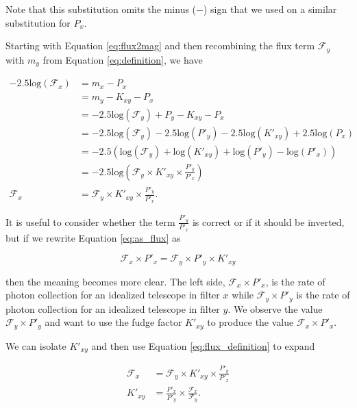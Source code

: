 \documentclass[linenumbers]{aastex631}
\begin{document}
Note that this substitution omits the minus ($-$) sign that we used on a
similar substitution for $P_x$.

Starting with Equation \ref{eq:flux2mag} and then
recombining the flux term $\mathcal{F}_y$ with $m_y$ from Equation
\ref{eq:definition}, we have

\begin{equation}
\begin{aligned}
\label{eq:as_flux}
  -2.5 \text{log}(\mathcal{F}_x)
      &= m_x - P_x \\
      &= m_y - K_{xy} - P_x \\
      &= -2.5 \text{log}(\mathcal{F}_y) + P_y - K_{xy} - P_x \\
      &= -2.5 \text{log}(\mathcal{F}_y)
         - 2.5 \text{log}(P'_y)
         - 2.5 \text{log}(K'_{xy})
         + 2.5 \text{log}(P_x) \\
      &= -2.5 \left(
         \text{log}(\mathcal{F}_y)
         + \text{log}(K'_{xy})
         + \text{log}(P'_y)
         - \text{log}(P'_x)
        \right) \\
      &= -2.5 \text{log}\left(
        \mathcal{F}_y
        \times K'_{xy}
        \times \frac{P'_y}{P'_x}\right) \\
  \mathcal{F}_x &= \mathcal{F}_y \times K'_{xy} \times \frac{P'_y}{P'_x}.
\end{aligned}
\end{equation}

It is useful to consider whether the term $\frac{P'_y}{P'_x}$ is correct or if
it should be inverted, but if we rewrite Equation \ref{eq:as_flux} as

\begin{equation}
  \mathcal{F}_x \times P'_x = \mathcal{F}_y \times P'_y \times K'_{xy}
\end{equation}

\noindent then the meaning becomes more clear. The left side, $\mathcal{F}_x
\times P'_x$, is the rate of photon collection for an idealized telescope in
filter $x$ while $\mathcal{F}_y \times P'_y$ is the rate of photon collection
for an idealized telescope in filter $y$. We observe the value $\mathcal{F}_y
\times P'_y$ and want to use the fudge factor $K'_{xy}$ to produce the value
$\mathcal{F}_x \times P'_x$.

We can isolate $K'_{xy}$ and then use Equation \ref{eq:flux_definition} to expand

\begin{equation}
\begin{aligned}
  \mathcal{F}_x &= \mathcal{F}_y \times K'_{xy} \times \frac{P'_y}{P'_x} \\
        K'_{xy} &= \frac{P'_x}{P'_y} \times \frac{\mathcal{F}_x}{\mathcal{F}_y} .
\end{aligned}
\end{equation}
\end{document}
